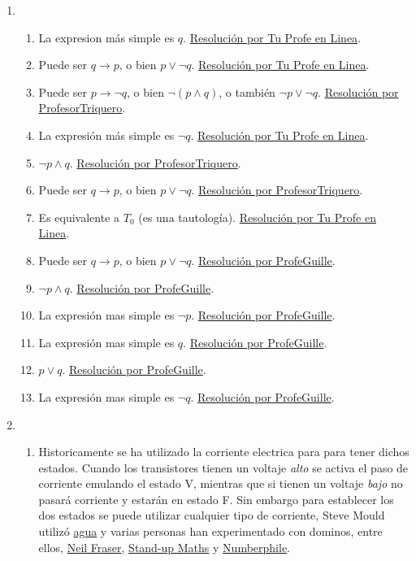 \documentclass[a4paper]{article}
\newcommand{\exercise}{\item}
\newcommand{\then}{\to}
\begin{document}
\begin{enumerate}
\begin{enumerate} [label=(\alph*)]
\end{enumerate}\exercise\begin{enumerate} [label=(\alph*)]		\item La expresion más simple es $q$. \href{https://youtu.be/BOydu7cpv70}{Resolución por Tu Profe en Linea}.
		\item Puede ser $q \then p$, o bien $p \lor \neg q$. \href{https://youtu.be/BOydu7cpv70?t=334}{Resolución por Tu Profe en Linea}.
		\item Puede ser $p \then \neg q$, o bien $\neg ( p \land q )$, o también $\neg p \lor \neg q$. \href{https://youtu.be/p005yi28rgk?t=392}{Resolución por ProfesorTriquero}.
		\item La expresión más simple es $\neg q$. \href{https://youtu.be/BOydu7cpv70?t=884}{Resolución por Tu Profe en Linea}.
		\item $\neg p \land q$. \href{https://youtu.be/p005yi28rgk?t=737}{Resolución por ProfesorTriquero}.
		\item Puede ser $q \then p$, o bien $p \lor \neg q$. \href{https://youtu.be/p005yi28rgk?t=995}{Resolución por ProfesorTriquero}.
		\item Es equivalente a $T_0$ (es una tautología). \href{https://youtu.be/BOydu7cpv70?t=586}{Resolución por Tu Profe en Linea}.
		\item Puede ser $q \then p$, o bien $p \lor \neg q$. \href{https://youtu.be/5r8S-wMJq7I}{Resolución por ProfeGuille}.
		\item $\neg p \land q$. \href{https://youtu.be/Ayk4qXcoiOM}{Resolución por ProfeGuille}.
		\item La expresión mas simple es $\neg p$. \href{https://youtu.be/UZDME4cZxNc}{Resolución por ProfeGuille}.
		\item La expresión mas simple es $q$. \href{https://youtu.be/KyIdCTWZuJ8}{Resolución por ProfeGuille}.
		\item $p \lor q$. \href{https://youtu.be/shOOoVRqKcA}{Resolución por ProfeGuille}.
		\item La expresión mas simple es $\neg q$. \href{https://youtu.be/DbjwP3w5yTE}{Resolución por ProfeGuille}.
\end{enumerate}\exercise\begin{enumerate} [label=(\alph*)]		\item Historicamente se ha utilizado la corriente electrica para para tener dichos estados. Cuando los transistores tienen un voltaje \textit{alto} se activa el paso de corriente emulando el estado V, mientras que si tienen un voltaje \textit{bajo} no pasará corriente y estarán en estado F. Sin embargo para establecer los dos estados se puede utilizar cualquier tipo de corriente, Steve Mould utilizó \href{https://youtu.be/IxXaizglscw}{agua} y varias personas han experimentado con dominos, entre ellos, \href{https://youtu.be/SudixyugiX4}{Neil Fraser}, \href{https://youtu.be/OpLU__bhu2w}{Stand-up Maths} y \href{https://youtu.be/lNuPy-r1GuQ}{Numberphile}.  

\end{enumerate}
\end{enumerate}
\end{document}
